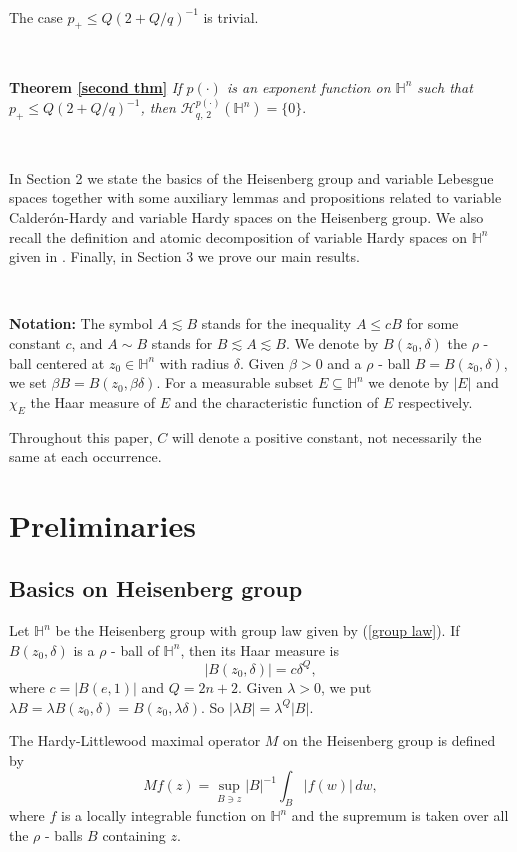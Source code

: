 \documentclass[oneside,10pt]{article}
\begin{document}
\

The case $p_{+} \leq Q (2 + Q/q)^{-1}$ is trivial.

\

{\bf Theorem \ref{second thm}} \textit{If $p(\cdot)$ is an exponent function on $\mathbb{H}^n$ such that $p_{+} \leq Q (2 + Q/q)^{-1}$, then 
$\mathcal{H}^{p(\cdot)}_{q, \, 2}(\mathbb{H}^{n}) = \{ 0 \}.$}

\

In Section 2 we state the basics of the Heisenberg group and variable Lebesgue spaces together with some auxiliary lemmas and propositions related to variable Calder\'on-Hardy and variable Hardy spaces on the Heisenberg group. We also recall the definition and atomic decomposition of variable Hardy spaces on $\mathbb{H}^n$ given in \cite{Fang}. Finally, in Section 3 we prove our main results.

\

\textbf{Notation:} The symbol $A \lesssim B$ stands for the inequality $A \leq c B$ for some constant $c$, and $A \sim B$ stands for 
$B \lesssim A \lesssim B$. We denote by $B(z_0, \delta)$ the $\rho$ - ball centered at $z_0 \in \mathbb{H}^{n}$ with radius $\delta$. 
Given $\beta > 0$ and a $\rho$ - ball $B= B(z_0, \delta)$, we set $\beta B= B(z_0, \beta \delta)$. For a measurable subset 
$E\subseteq \mathbb{H}^{n}$ we denote by $\left\vert E\right\vert $ and $\chi_{E}$ the Haar measure of $E$ and the characteristic 
function of $E$ respectively. 

Throughout this paper, $C$ will denote a positive constant, not necessarily the same at each occurrence.


\section{Preliminaries}

\subsection{Basics on Heisenberg group}

Let $\mathbb{H}^n$ be the Heisenberg group with group law given by (\ref{group law}). 
If $B(z_0, \delta)$ is a $\rho$ - ball of $\mathbb{H}^n$, then its Haar measure is
\[
|B(z_0, \delta)| = c \delta^{Q},
\]
where $c = |B(e,1)|$ and  $Q = 2n+2$. Given $\lambda > 0$, we put $\lambda B = \lambda B(z_0, \delta) = 
B(z_0, \lambda \delta)$. So $|\lambda B| = \lambda^{Q}	|B|$.

The Hardy-Littlewood maximal operator $M$ on the Heisenberg group is defined by
\[
Mf(z) = \sup_{B \ni z} |B|^{-1}\int_{B} |f(w)| \, dw,
\]
where $f$ is a locally integrable function on $\mathbb{H}^{n}$ and the supremum is taken over all the $\rho$ - balls $B$ containing $z$.
\end{document}
